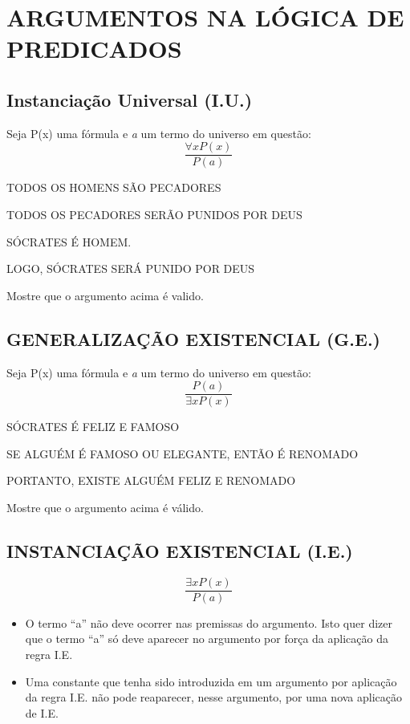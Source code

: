 \chapter{ARGUMENTOS NA LÓGICA DE PREDICADOS}

\setcounter{exemplo}{0}

\section{Instanciação Universal (I.U.)}
Seja P(x) uma fórmula e \textit{a} um termo do universo em questão:
\[
\boxed{\frac{\forall x P(x)}{P(a)}}
\]

\begin{exemplo}
    \leavevmode

    TODOS OS HOMENS SÃO PECADORES

    TODOS OS PECADORES SERÃO PUNIDOS POR DEUS

    SÓCRATES É HOMEM.

    LOGO, SÓCRATES SERÁ PUNIDO POR DEUS
\end{exemplo}

\noindent Mostre que o argumento acima é valido.

\section{GENERALIZAÇÃO EXISTENCIAL (G.E.)}
Seja P(x) uma fórmula e \textit{a} um termo do universo em questão:
\[
\boxed{\frac{P(a)}{\exists x P(x)}}
\]

\begin{exemplo}
    \leavevmode

    SÓCRATES É FELIZ E FAMOSO

    SE ALGUÉM É FAMOSO OU ELEGANTE, ENTÃO É RENOMADO

    PORTANTO, EXISTE ALGUÉM FELIZ E RENOMADO
\end{exemplo}

\noindent Mostre que o argumento acima é válido.

\section{INSTANCIAÇÃO EXISTENCIAL (I.E.)}

\[
    \boxed{\frac{\exists x P(x)}{P(a)}}
\]

\begin{itemize}
    \item O termo ``a'' não deve ocorrer nas premissas do argumento. Isto quer dizer que o termo ``a'' só deve aparecer no argumento por força da aplicação da regra I.E.
    \item Uma constante que tenha sido introduzida em um argumento por aplicação da regra I.E. não pode reaparecer, nesse argumento, por uma nova aplicação de I.E.
\end{itemize}

